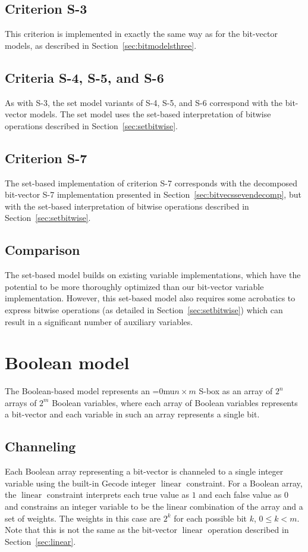 \documentclass[a4paper,10pt,twoside,openright]{book}
\newcommand*\nbym{\begingroup\medmuskip=0mu\relax$n \times m$\endgroup}
\DeclareMathOperator{\lin}{linear}
\begin{document}
\subsection{Criterion S-3}
This criterion is implemented in exactly the same way as for the bit-vector models,
as described in Section~\ref{sec:bitmodelsthree}.

\subsection{Criteria S-4, S-5, and S-6}
As with S-3, the set model variants of S-4, S-5, and S-6 correspond with the bit-vector models. 
The set model uses the set-based interpretation of bitwise operations described in 
Section~\ref{sec:setbitwise}.

\subsection{Criterion S-7}
The set-based implementation of criterion S-7 corresponds with the decomposed bit-vector S-7
implementation presented in Section~\ref{sec:bitvecssevendecomp}, but with
the set-based interpretation of bitwise operations described in
Section~\ref{sec:setbitwise}.

\subsection{Comparison}
The set-based model builds on existing variable implementations, which have the potential
to be more thoroughly optimized than our bit-vector variable implementation.
However, this set-based model also requires some acrobatics to express bitwise operations
(as detailed in Section~\ref{sec:setbitwise})
which can result in a significant number of auxiliary variables.

\section{Boolean model}
\label{sec:boolmodel}
The Boolean-based model represents an \nbym{} S-box as an array of $2^n$ arrays of $2^m$ Boolean variables,
where each array of Boolean variables represents a bit-vector and
each variable in such an array represents a single bit.

\subsection{Channeling}
\label{sec:boolchanneling}
Each Boolean array representing a bit-vector is channeled to a single integer variable
using the built-in Gecode integer $\lin$ constraint. 
For a Boolean array, the $\lin$ constraint interprets each true value as $1$ and each
false value as $0$ and 
constrains an integer variable to 
be the linear combination of the array and a set of weights.
The weights in this case are $2^k$ for each possible bit $k$, $0 \leq k < m$.
Note that this is not the same as the bit-vector $\lin$ operation described in Section~\ref{sec:linear}.
\end{document}
